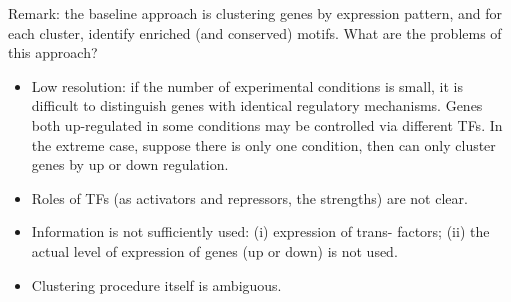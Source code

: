 \documentclass[11pt]{article}
\begin{document}
\begin{enumerate}
Remark: the baseline approach is clustering genes by expression pattern, and for each cluster, identify enriched (and conserved) motifs. What are the problems of this approach? 
\begin{itemize}
\item Low resolution: if the number of experimental conditions is small, it is difficult to distinguish genes with identical regulatory mechanisms. Genes both up-regulated in some conditions may be controlled via different TFs. In the extreme case, suppose there is only one condition, then can only cluster genes by up or down regulation. 
\item Roles of TFs (as activators and repressors, the strengths) are not clear.
\item Information is not sufficiently used: (i) expression of trans- factors; (ii) the actual level of expression of genes (up or down) is not used. 
\item Clustering procedure itself is ambiguous. 
\end{itemize}
\end{enumerate}
\newpage
\end{document}
